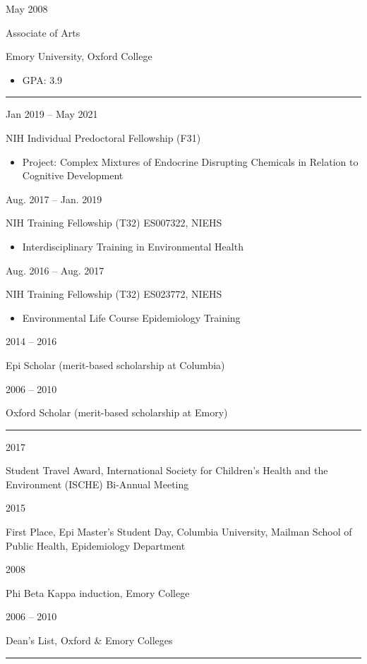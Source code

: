 \documentclass[a4paper,10pt]{article}
\newlength{\cvcolumngapwidth}
\newlength{\cvleftcolumnwidth}
\newlength{\cvrightcolumnwidth}
\newcommand{\cvsectionstyle}[1]{{\normalsize\cvsectionfont\textcolor{cvsectioncolor}{#1}}}
\newcommand{\cvtitlestyle}[1]{{\large\cvtitlefont\textcolor{cvtitlecolor}{#1}}}
\newcommand{\cvdurationstyle}[1]{{\small\cvdurationfont\textcolor{cvdurationcolor}{#1}}}
\newlength{\cvafteritemskipamount}
\newlength{\cvaftersectionskipamount}
\newlength{\cvaftertitleskipamount}
\newlength{\cvparskip}
\newcommand{\cvsection}[1]{
    \begin{minipage}[t]{\cvleftcolumnwidth}
        \raggedleft\cvsectionstyle{#1}
    \end{minipage}%
    \hspace{\cvcolumngapwidth}%
    \begin{minipage}[t]{\cvrightcolumnwidth}
        \textcolor{cvrulecolor}{\rule{\cvrightcolumnwidth}{0.3mm}}
    \end{minipage}

    \vspace{\cvaftersectionskipamount}
}
\newcommand{\cvitem}[2]{
    \begin{minipage}[t]{\cvleftcolumnwidth}
        \raggedleft #1
    \end{minipage}%
    \hspace{\cvcolumngapwidth}%
    \begin{minipage}[t]{\cvrightcolumnwidth}
        \setlength{\parskip}{\cvparskip} #2
    \end{minipage}

    \vspace{\cvafteritemskipamount}
}
\newcommand{\cvtitle}[1]{
    \cvtitlestyle{#1}

    \vspace{\cvaftertitleskipamount}
    \vspace{-\cvparskip}
}
\begin{document}
\cvitem{
    \cvdurationstyle{May 2008}
}{
    \cvtitle{Associate of Arts}

    Emory University, Oxford College
    \begin{itemize}[leftmargin=*]
	\item GPA: 3.9
    \end{itemize}
}


\cvsection{FELLOWSHIPS \& SCHOLARSHIPS}

\cvitem{
    \cvdurationstyle{Jan 2019 -- May 2021}
}{
    NIH Individual Predoctoral Fellowship (F31)
    \begin{itemize}[leftmargin=*]
    	\item Project: Complex Mixtures of Endocrine Disrupting Chemicals in Relation to Cognitive Development
    \end{itemize}
}
\cvitem{
    \cvdurationstyle{Aug. 2017 -- Jan. 2019}
}{
    NIH Training Fellowship (T32) ES007322, NIEHS
    \begin{itemize}[leftmargin=*]
     \item Interdisciplinary Training in Environmental Health
    \end{itemize}
    }
\cvitem{
    \cvdurationstyle{Aug. 2016 -- Aug. 2017}
}{
    NIH Training Fellowship (T32) ES023772, NIEHS
    \begin{itemize}[leftmargin=*]
     \item Environmental Life Course Epidemiology Training
    \end{itemize}
    }
\cvitem{
    \cvdurationstyle{2014 -- 2016}
}{
    Epi Scholar (merit-based scholarship at Columbia)
}
\cvitem{
    \cvdurationstyle{2006 -- 2010}
}{
    Oxford Scholar (merit-based scholarship at Emory)
}

\cvsection{HONORS}
\cvitem{
    \cvdurationstyle{2017}
}{
    Student Travel Award, International Society for Children’s Health and the Environment (ISCHE) Bi-Annual Meeting
}
\cvitem{
    \cvdurationstyle{2015}
}{
   First Place, Epi Master’s Student Day, Columbia University, Mailman School of Public Health, Epidemiology Department
}
\cvitem{
    \cvdurationstyle{2008}
}{
    Phi Beta Kappa induction, Emory College
}
\cvitem{
    \cvdurationstyle{2006 -- 2010}
}{
    Dean's List, Oxford \& Emory Colleges}


\cvsection{WORK EXPERIENCE}
\end{document}
